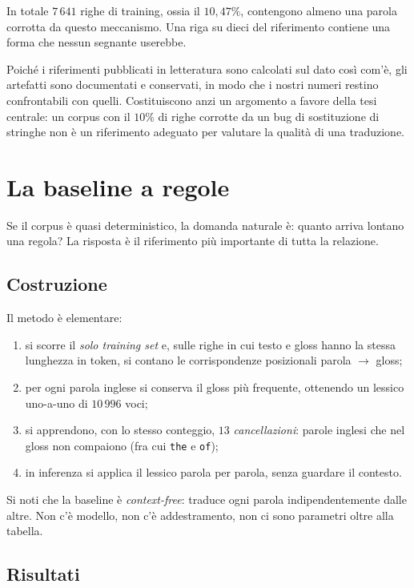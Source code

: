 In totale $7\,641$ righe di training, ossia il $10{,}47\%$, contengono almeno
una parola corrotta da questo meccanismo. Una riga su dieci del riferimento
contiene una forma che nessun segnante userebbe.

Poiché i riferimenti pubblicati in letteratura sono calcolati sul dato così
com'è, gli artefatti sono documentati e conservati, in modo che i nostri numeri
restino confrontabili con quelli. Costituiscono anzi un argomento a favore della
tesi centrale: un corpus con il $10\%$ di righe corrotte da un bug di
sostituzione di stringhe non è un riferimento adeguato per valutare la qualità
di una traduzione.

\section{La baseline a regole}
\label{sec:baseline-regole}

Se il corpus è quasi deterministico, la domanda naturale è: quanto arriva
lontano una regola? La risposta è il riferimento più importante di tutta la
relazione.

\subsection{Costruzione}

Il metodo è elementare:

\begin{enumerate}
  \item si scorre il \emph{solo training set} e, sulle righe in cui testo e
        gloss hanno la stessa lunghezza in token, si contano le corrispondenze
        posizionali parola $\to$ gloss;
  \item per ogni parola inglese si conserva il gloss più frequente, ottenendo un
        lessico uno-a-uno di $10\,996$ voci;
  \item si apprendono, con lo stesso conteggio, $13$ \emph{cancellazioni}: parole
        inglesi che nel gloss non compaiono (fra cui \texttt{the} e \texttt{of});
  \item in inferenza si applica il lessico parola per parola, senza guardare il
        contesto.
\end{enumerate}

Si noti che la baseline è \emph{context-free}: traduce ogni parola
indipendentemente dalle altre. Non c'è modello, non c'è addestramento, non ci
sono parametri oltre alla tabella.

\subsection{Risultati}

